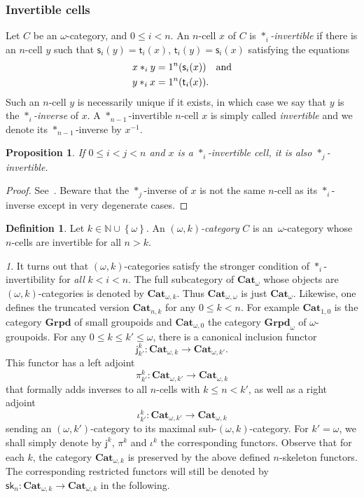 \documentclass[reqno]{amsart}
\theoremstyle{plain}
\newtheorem{proposition}[subsubsection]{Proposition}
\theoremstyle{definition}
\newtheorem{definition}[subsubsection]{Definition}
\theoremstyle{remark}
\newtheorem{paragr}[subsubsection]{} %
\newcommand{\nmbr}[1]{\mathbb #1}
\newcommand{\N}{\nmbr{N}}
\newcommand{\set}[1]{\left\{#1\right\}}
\newcommand{\pair}[2]{(#1,#2)}       %
\newcommand{\source}{\mathsf{s}} %
\newcommand{\target}{\mathsf{t}} %
\newcommand{\unit}[1]{1^{#1}} %
\newcommand{\ctg}[1]{\mathbf{#1}}  %
\newcommand{\Cat}{\ctg{Cat}}   %
\newcommand{\nCat}[1]{\Cat_{#1}}  %
\newcommand{\npCat}[2]{\Cat_{#1,#2}}  %
\newcommand{\opCat}[1]{\Cat_{\omega,#1}} %
\newcommand{\oCat}{\nCat{\omega}} %
\newcommand{\Grpd}{\ctg{Grpd}}
\newcommand{\nGrpd}[1]{\Grpd_{#1}} %
\newcommand{\oGrpd}{\nGrpd{\omega}} %
\newcommand{\functor}[1]{\mathsf{#1}} %
\newcommand{\emb}[2]{\functor{j}_{#2}^{#1}}%
\newcommand{\pifun}[2]{\functor{\pi}_{#2}^{#1}}%
\newcommand{\maxgr}[2]{\functor{\iota}_{#2}^{#1}}%
\newcommand{\skl}[1]{\functor{sk}_{#1}}%
\newcommand{\oemb}[1]{\emb{#1}{}}%
\newcommand{\opifun}[1]{\pifun{#1}{}}%
\newcommand{\omaxgr}[1]{\maxgr{#1}{}}%
\newcommand{\comp}[1]{\ast_{#1}} %
\newcommand{\sce}[1]{\source_{#1}} %
\newcommand{\tge}[1]{\target_{#1}} %
\newcommand{\inv}[1]{{#1}^{-1}} %
\newcommand{\oo}{\ensuremath{\omega}}
\newcommand{\ook}[1]{\ensuremath{\pair{\omega}{#1}}}
\newcommand{\nbd}{\nobreakdash} %
\begin{document}
\subsubsection{Invertible cells}\label{ssubsec:invert}
Let $C$ be an \oo-category, and $0\leq i <n$. An $n$-cell $x$ of $C$ is {\em $\comp i$-invertible} if there is an $n$-cell $y$ such that $\sce i(y)=\tge i(x)$, $\tge i(y)=\sce i(x)$ satisfying the equations 
  \begin{align*}
    x\comp i y & = \unit n(\sce i(x)) \quad \hbox{and}\\
    y\comp i x & =  \unit n(\tge i(x)).
  \end{align*}
  Such an $n$-cell $y$ is necessarily unique if it exists, in which case
  we say that $y$ is  the {\em $\comp i$-inverse} of $x$. A
  $\comp {n-1}$-invertible $n$-cell $x$ is simply called {\em
    invertible} and we denote its $\comp{n-1}$-inverse by $\inv x$. 
  \begin{proposition}\label{prop:invcell}
    If $0\leq i< j<n$ and $x$ is a $\comp i$-invertible cell, it is also $\comp j$-invertible.
  \end{proposition}
  \begin{proof}
    See~\cite[14.5]{abgmmm:polybk}. Beware that the $\comp j$-inverse
    of $x$ is not the same $n$-cell as its $\comp i$-inverse except in
    very degenerate cases. 
  \end{proof}
  \begin{definition}
    Let $k\in\N\cup\set{\oo}$. An {\em \ook k-category} $C$ is
    an~\oo-category whose $n$-cells are invertible for all $n>k$.
    \end{definition}
  \begin{paragr}\label{paragr:invert}
    It turns out that \ook k-categories satisfy the stronger
    condition of $\comp i$-invertibility for {\em all} $k<i<n$.  The full subcategory of
    $\oCat$ whose objects are \ook{k}-categories is denoted by $\opCat
    k$. Thus $\opCat{\oo}$ is just $\oCat$. Likewise, one defines the truncated version $\npCat nk$ for
    any $0\leq k<n$.  For example $\npCat 10$ is the category $\Grpd$
    of small groupoids and $\opCat 0$ the category $\oGrpd$ of
    \oo-groupoids. For any $0 \leq k \leq k'\leq \oo$, there is a canonical
    inclusion functor
    \[
      \emb{k}{k'} \colon \opCat{k} \to \opCat{k'}.
    \]
    This functor has a left adjoint
    \[
      \pifun{k}{k'} \colon \opCat{k'} \to \opCat{k}
    \]
    that formally adds inverses to all $n$-cells with $k \leq n < k'$,
    as well as a right adjoint 
    \[
      \maxgr{k}{k'}\colon\opCat{k'}\to \opCat{k}
    \]
    sending an \ook{k'}\nbd-category to its maximal
    sub\nbd-\ook{k}\nbd-category. For $k'=\oo$, we shall simply denote
    by $\oemb k$, $\opifun k$ and $\omaxgr k$ the corresponding
    functors. Observe that for each $k$, the category $\opCat k$ is
    preserved by the above defined $n$-skeleton functors. The
    corresponding restricted functors will still be denoted by $\skl n:\opCat
    k\to\opCat k$ in the following.
 \end{paragr} 
\end{document}
